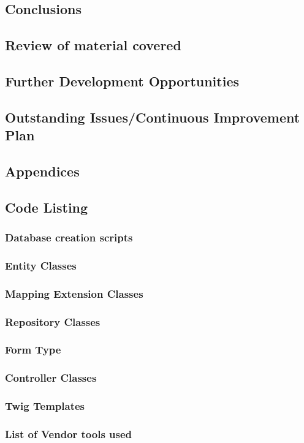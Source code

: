 \documentclass[a4paper,12pt]{article}
\begin{document}
\begin{samepage}
\section {Conclusions}
\subsection {Review of material covered }
\subsection {Further Development Opportunities}
\subsection {Outstanding Issues/Continuous Improvement Plan}
\end{samepage}
\begin{samepage}

\section {Appendices}
\subsection {Code Listing}

\subsubsection {Database creation scripts}
\subsubsection {Entity Classes}
\subsubsection {Mapping Extension Classes}
\subsubsection {Repository Classes}
\subsubsection {Form Type}
\subsubsection {Controller Classes}
\subsubsection {Twig Templates}
\subsubsection {List of Vendor tools used}
\end{samepage}
\newpage\printbibliography[title={Bibliography}]
\end{document}
